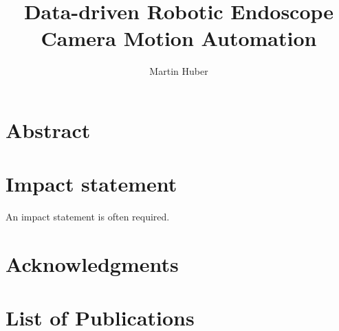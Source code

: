 \documentclass[british,a4paper,11pt,twoside]{StyleThese}
\title{Data-driven Robotic Endoscope Camera Motion Automation}\let\thetitle\@title
\author{Martin Huber}\let\theauthor\@author
\begin{document}
\frontmatter



\dominitoc


\copyrightpage{\the\year}{\theauthor}


\cleardoublepage

\declarationpage{\theauthor}

\cleardoublepage
\chapter{Abstract}


\cleardoublepage
\chapter{Impact statement}
An impact statement is often required.

\cleardoublepage
\chapter{Acknowledgments}


\cleardoublepage
\chapter{List of Publications}


\cleardoublepage
\tableofcontents

\clearpage
\listoftables
\clearpage
\listoffigures

\mainmatter



%
%
%
%

\appendix


\backmatter


\end{document}

